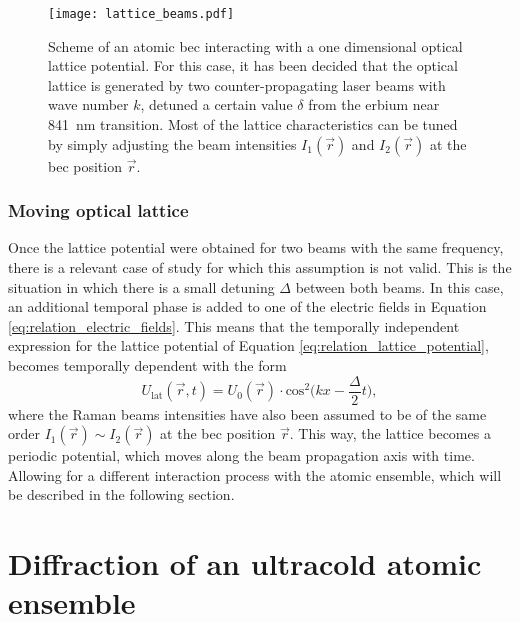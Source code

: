 \begin{figure}[!htbp]\centering
	\texttt{[image: lattice\_beams.pdf]}
	\caption[Scheme of an atomic \ac{bec} interacting with a one dimensional optical lattice potential]{Scheme of an atomic \ac{bec} interacting with a one dimensional optical lattice potential. For this case, it has been decided that the optical lattice is generated by two counter-propagating laser beams with wave number $k$, detuned a certain value $\delta$ from the erbium near \SI{841}{\nano\meter} transition. Most of the lattice characteristics can be tuned by simply adjusting the beam intensities $I_1(\vec{r})$ and $I_2(\vec{r})$ at the \ac{bec} position $\vec{r}$.}\label{fig:lattice_beams}
\end{figure}

\subsubsection{Moving optical lattice}

Once the lattice potential were obtained for two beams with the same frequency, there is a relevant case of study for which this assumption is not valid. This is the situation in which there is a small detuning $\Delta$ between both beams. In this case, an additional temporal phase is added to one of the electric fields in Equation \eqref{eq:relation_electric_fields}. This means that the temporally independent expression for the lattice potential of Equation \eqref{eq:relation_lattice_potential}, becomes temporally dependent with the form
\begin{equation}\label{eq:relation_moving_lattice_potential}
	U_{\text{lat}}(\vec{r},t) = U_{0}(\vec{r}) \cdot \text{cos}^2\bigg(kx-\frac{\Delta}{2}t\bigg),
\end{equation} 
where the Raman beams intensities have also been assumed to be of the same order $I_{1}(\vec{r}) \sim I_{2}(\vec{r})$ at the \ac{bec} position $\vec{r}$. This way, the lattice becomes a periodic potential, which moves along the beam propagation axis with time. Allowing for a different interaction process with the atomic ensemble, which will be described in the following section.


\section{Diffraction of an ultracold atomic ensemble}\label{sec:diffraction_atomic_ensemble}

